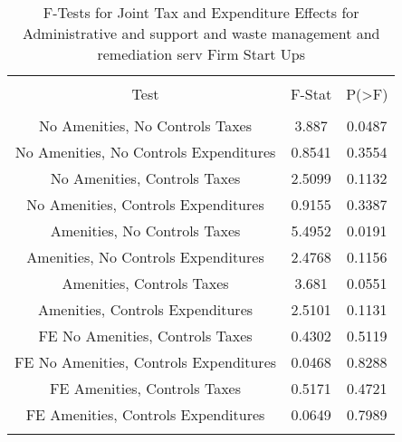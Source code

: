 
\begin{table}[!htbp] \centering 
  \caption{F-Tests for Joint Tax and Expenditure Effects for Administrative and support and waste management and remediation serv Firm Start Ups} 
  \label{56Ftests} 
\begin{tabular}{@{\extracolsep{5pt}} ccc} 
\\[-1.8ex]\hline 
\hline \\[-1.8ex] 
Test & F-Stat & P(\textgreater F) \\ 
\hline \\[-1.8ex] 
No Amenities, No Controls Taxes & 3.887 & 0.0487 \\ 
No Amenities, No Controls Expenditures & 0.8541 & 0.3554 \\ 
No Amenities, Controls Taxes & 2.5099 & 0.1132 \\ 
No Amenities, Controls Expenditures & 0.9155 & 0.3387 \\ 
Amenities, No Controls Taxes & 5.4952 & 0.0191 \\ 
Amenities, No Controls Expenditures & 2.4768 & 0.1156 \\ 
Amenities, Controls Taxes & 3.681 & 0.0551 \\ 
Amenities, Controls Expenditures & 2.5101 & 0.1131 \\ 
FE No Amenities, Controls Taxes & 0.4302 & 0.5119 \\ 
FE No Amenities, Controls Expenditures & 0.0468 & 0.8288 \\ 
FE Amenities, Controls Taxes & 0.5171 & 0.4721 \\ 
FE Amenities, Controls Expenditures & 0.0649 & 0.7989 \\ 
\hline \\[-1.8ex] 
\end{tabular} 
\end{table} 
